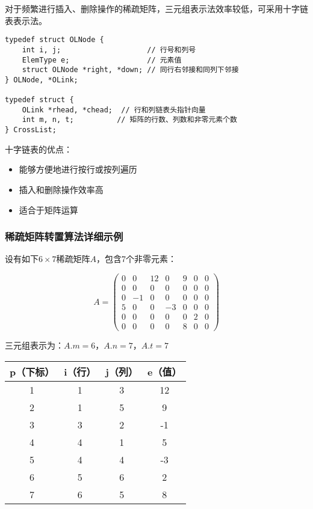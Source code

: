 \documentclass[12pt,a4paper]{amsart}
\begin{document}
对于频繁进行插入、删除操作的稀疏矩阵，三元组表示法效率较低，可采用十字链表表示法。

\begin{lstlisting}[caption=十字链表结构定义]
typedef struct OLNode {
    int i, j;                    // 行号和列号
    ElemType e;                  // 元素值
    struct OLNode *right, *down; // 同行右邻接和同列下邻接
} OLNode, *OLink;

typedef struct {
    OLink *rhead, *chead;  // 行和列链表头指针向量
    int m, n, t;          // 矩阵的行数、列数和非零元素个数
} CrossList;
\end{lstlisting}

十字链表的优点：
\begin{itemize}
\item 能够方便地进行按行或按列遍历
\item 插入和删除操作效率高
\item 适合于矩阵运算
\end{itemize}

\subsubsection{稀疏矩阵转置算法详细示例}

设有如下$6 \times 7$稀疏矩阵$A$，包含7个非零元素：

$$
A = \begin{pmatrix}
0 & 0 & 12 & 0 & 9 & 0 & 0 \\
0 & 0 & 0 & 0 & 0 & 0 & 0 \\
0 & -1 & 0 & 0 & 0 & 0 & 0 \\
5 & 0 & 0 & -3 & 0 & 0 & 0 \\
0 & 0 & 0 & 0 & 0 & 2 & 0 \\
0 & 0 & 0 & 0 & 8 & 0 & 0
\end{pmatrix}
$$

三元组表示为：$A.m = 6$，$A.n = 7$，$A.t = 7$

\begin{center}
\begin{tabular}{|c|c|c|c|}
\hline
p（下标） & i（行） & j（列） & e（值） \\
\hline
1 & 1 & 3 & 12 \\
2 & 1 & 5 & 9 \\
3 & 3 & 2 & -1 \\
4 & 4 & 1 & 5 \\
5 & 4 & 4 & -3 \\
6 & 5 & 6 & 2 \\
7 & 6 & 5 & 8 \\
\hline
\end{tabular}
\end{center}
\end{document}
